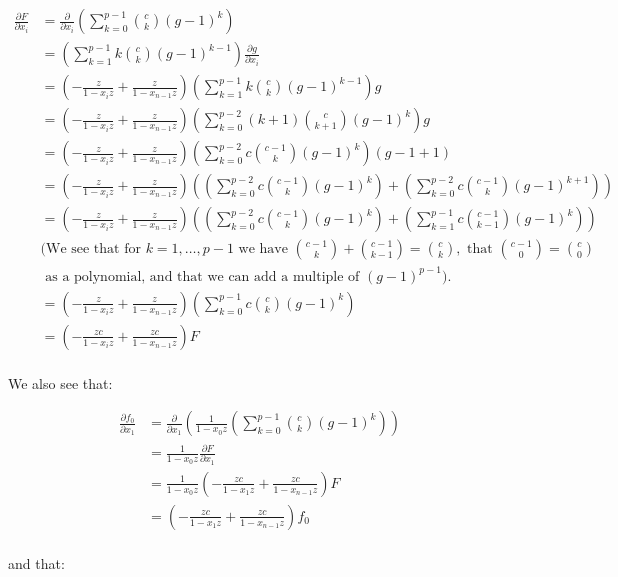 \documentclass{article}
\numberwithin{equation}{section}
\begin{document}
\begin{align*}
\frac{\partial F}{\partial x_i}&=\frac{\partial}{\partial x_i}\left(\sum_{k=0}^{p-1} \binom{c}{k} (g-1)^k\right)\\
&=\left(\sum_{k=1}^{p-1}k\binom{c}{k}(g-1)^{k-1}\right)\frac{\partial g}{\partial x_i}\\
&=\left(-\frac{z}{1-x_iz}+\frac{z}{1-x_{n-1}z}\right)\left(\sum_{k=1}^{p-1}k\binom{c}{k}(g-1)^{k-1}\right)g\\
&=\left(-\frac{z}{1-x_iz}+\frac{z}{1-x_{n-1}z}\right)\left(\sum_{k=0}^{p-2}(k+1)\binom{c}{k+1}(g-1)^{k}\right)g\\
&=\left(-\frac{z}{1-x_iz}+\frac{z}{1-x_{n-1}z}\right)\left(\sum_{k=0}^{p-2}c\binom{c-1}{k}(g-1)^{k}\right)(g-1+1)\\
&=\left(-\frac{z}{1-x_iz}+\frac{z}{1-x_{n-1}z}\right)\left(\left(\sum_{k=0}^{p-2}c\binom{c-1}{k}(g-1)^{k}\right)+\left(\sum_{k=0}^{p-2}c\binom{c-1}{k}(g-1)^{k+1}\right)\right)\\
&=\left(-\frac{z}{1-x_iz}+\frac{z}{1-x_{n-1}z}\right)\left(\left(\sum_{k=0}^{p-2}c\binom{c-1}{k}(g-1)^{k}\right)+\left(\sum_{k=1}^{p-1}c\binom{c-1}{k-1}(g-1)^{k}\right)\right)\\
&\text{(We see that for }k=1,\dots,p-1\text{ we have }\binom{c-1}{k}+\binom{c-1}{k-1}=\binom{c}{k},\text{ that }\binom{c-1}{0}=\binom{c}{0}\\&\text{ as a polynomial, and that we can add a multiple of }(g-1)^{p-1}).\\
&=\left(-\frac{z}{1-x_iz}+\frac{z}{1-x_{n-1}z}\right)\left(\sum_{k=0}^{p-1}c\binom{c}{k}(g-1)^{k}\right)\\
&=\left(-\frac{zc}{1-x_iz}+\frac{zc}{1-x_{n-1}z}\right)F\\
\end{align*}

We also see that:

\begin{align*}
\frac{\partial f_0}{\partial x_1}&=\frac{\partial}{\partial x_1}\left(\frac{1}{1-x_0z}\left(\sum_{k=0}^{p-1} \binom{c}{k} (g-1)^k\right)\right)\\
&=\frac{1}{1-x_0z}\frac{\partial F}{\partial x_1}\\
&=\frac{1}{1-x_0z}\left(-\frac{zc}{1-x_1z}+\frac{zc}{1-x_{n-1}z}\right)F\\
&=\left(-\frac{zc}{1-x_1z}+\frac{zc}{1-x_{n-1}z}\right)f_0\\
\end{align*}

and that:
\end{document}
